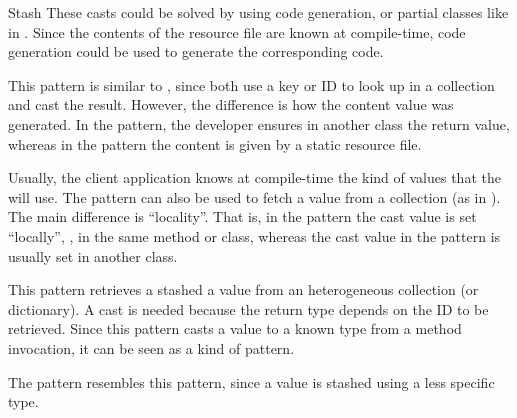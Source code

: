\begin{pattern}{Stash}
These casts could be solved by using code generation,
or partial classes like in \csharp{}.
Since the contents of the resource file are known at compile-time,
code generation could be used to generate the corresponding \java{} code.

This pattern is similar to ,
since both use a key or ID to look up in a collection and cast the result.
However, the difference is how the content value was generated.
In the  pattern,
the developer ensures in another class the return value,
whereas in the \thisp{} pattern the content is given by a static resource file.

Usually, the client application knows at compile-time the kind of values that the \thisp{} will use.
The \thisp{} pattern can also be used to fetch a value from a collection (as in ).
The main difference is ``locality''.
That is, in the \thisp{} pattern the cast value is set ``locally'', \ie,
in the same method or class,
whereas the cast value in the  pattern is usually set in another class.

\related{}
This pattern retrieves a stashed a value from an heterogeneous collection (or dictionary).
A cast is needed because the return type depends on the ID to be retrieved.
Since this pattern casts a value to a known type from a method invocation,
it can be seen as a kind of  pattern.

The  pattern resembles this pattern,
since a value is stashed using a less specific type.

\end{pattern}